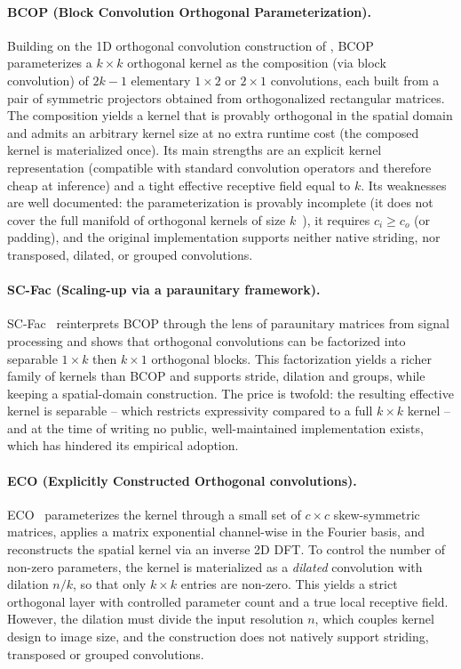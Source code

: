         \paragraph{BCOP (Block Convolution Orthogonal Parameterization).}
        Building on the 1D orthogonal convolution construction of \cite{xiao_dynamical_2018}, BCOP~\cite{li_preventing_2019} parameterizes a $k \times k$ orthogonal kernel as the composition (via block convolution) of $2k-1$ elementary $1 \times 2$ or $2 \times 1$ convolutions, each built from a pair of symmetric projectors obtained from orthogonalized rectangular matrices. The composition yields a kernel that is provably orthogonal in the spatial domain and admits an arbitrary kernel size at no extra runtime cost (the composed kernel is materialized once). Its main strengths are an explicit kernel representation (compatible with standard convolution operators and therefore cheap at inference) and a tight effective receptive field equal to $k$. Its weaknesses are well documented: the parameterization is provably incomplete (it does not cover the full manifold of orthogonal kernels of size $k$~\cite{li_preventing_2019}), it requires $c_i \geq c_o$ (or padding), and the original implementation supports neither native striding, nor transposed, dilated, or grouped convolutions.

        \paragraph{SC-Fac (Scaling-up via a paraunitary framework).}
        SC-Fac~\cite{su_scaling-up_2021} reinterprets BCOP through the lens of paraunitary matrices from signal processing and shows that orthogonal convolutions can be factorized into separable $1\times k$ then $k \times 1$ orthogonal blocks. This factorization yields a richer family of kernels than BCOP and supports stride, dilation and groups, while keeping a spatial-domain construction. The price is twofold: the resulting effective kernel is separable -- which restricts expressivity compared to a full $k\times k$ kernel -- and at the time of writing no public, well-maintained implementation exists, which has hindered its empirical adoption.

        \paragraph{ECO (Explicitly Constructed Orthogonal convolutions).}
        ECO~\cite{yu_constructing_2021} parameterizes the kernel through a small set of $c \times c$ skew-symmetric matrices, applies a matrix exponential channel-wise in the Fourier basis, and reconstructs the spatial kernel via an inverse 2D DFT. To control the number of non-zero parameters, the kernel is materialized as a \emph{dilated} convolution with dilation $n/k$, so that only $k\times k$ entries are non-zero. This yields a strict orthogonal layer with controlled parameter count and a true local receptive field. However, the dilation must divide the input resolution $n$, which couples kernel design to image size, and the construction does not natively support striding, transposed or grouped convolutions.

